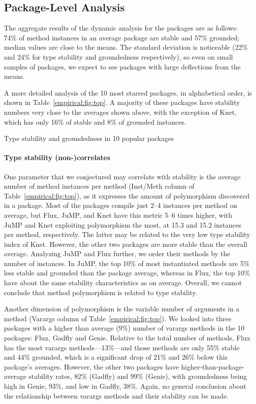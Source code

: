 \documentclass[oneside,openright,titlepage,numbers=noenddot,%
headinclude,footinclude,cleardoublepage=empty,abstract=on,
BCOR=5mm,paper=a4,fontsize=11pt,
dvipsnames
]{scrreprt}
\begin{document}
\subsection{Package-Level Analysis}

The aggregate results of the dynamic analysis for the \goodpkgsnum packages are
as follows: 74\% of method instances in an average package are stable and 57\%
grounded; median values are close to the means. The standard deviation is
noticeable (22\% and 24\% for type stability and groundedness respectively), so
even on small samples of packages, we expect to see packages with large
deflections from the means.

A more detailed analysis of the 10 most starred packages, in alphabetical order,
is shown in Table~\ref{empirical:fig:top}. A majority of these packages have
stability numbers very close to the averages shown above, with the exception of
Knet, which has only 16\% of stable and 8\% of grounded instances.


\begin{table}[h]\small
\caption{Type stability and groundedness in 10 popular packages}%
\label{empirical:fig:top}
\centering

\end{table}


\paragraph{Type stability (non-)correlates}
One parameter that we conjectured may correlate with stability is the average
number of method instances per method (Inst/Meth column of
Table~\ref{empirical:fig:top}), as it expresses the amount of polymorphism
discovered in a package. Most of the packages compile just 2--4 instances per
method on average, but Flux, JuMP, and Knet have this metric 5--6 times higher,
with JuMP and Knet exploiting polymorphism the most, at 15.3 and 15.2
instances per method, respectively. The latter may be related to the very low type stability
index of Knet. However, the other two packages are more stable than the overall
average. Analyzing JuMP and Flux further, we order their methods by the number
of instances. In JuMP, the top 10\% of most instantiated methods are 5\% less
stable and grounded than the package average, whereas in Flux, the top 10\% have
about the same stability characteristics as on average. Overall, we cannot
conclude that method polymorphism is related to type stability.

Another dimension of polymorphism is the variable number of arguments in a
method (Varargs column of Table~\ref{empirical:fig:top}). We looked into three
packages with a higher than average (9\%) number of varargs methods in the 10
packages: Flux, Gadfly and Genie. Relative to the total number of methods, Flux has the most
varargs methods---13\%---and those methods are only 55\% stable and 44\%
grounded, which is a significant drop of 21\% and 26\% below this package's
averages. However, the other two packages have higher-than-package-average
stability rates, 82\% (Gadfly) and 99\% (Genie), with groundedness being high in
Genie, 93\%, and low in Gadfly, 38\%. Again, no general conclusion about the
relationship between varargs methods and their stability can be made.
\end{document}
